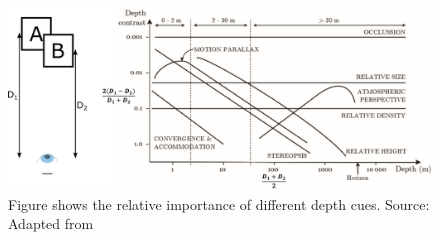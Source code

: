 \begin{figure}[h!]
\centering
\includegraphics[width=0.99\columnwidth]{images/other/cutting_and_vishton}
\caption[Relative importance of depth cues]{Figure shows the relative importance of different depth cues. Source: Adapted from \cite{cutting1995perceiving}}
\label{fig:cutting_and_vishton}
\end{figure}

